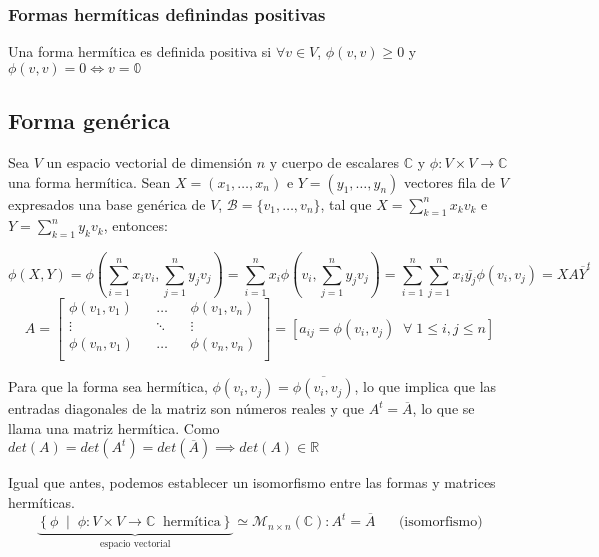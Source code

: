 \documentclass{preset}
\newcommand{\compconj}[1]{%
  \overline{#1}%
}
\begin{document}
\subsubsection{Formas hermíticas definindas positivas}
Una forma hermítica es definida positiva si $\forall v \in V$, $\phi(v,v)\geq 0$ y $\phi(v,v)=0 \iff v=\mathbb{0}$

\vspace{-15pt}
\subsection{Forma genérica}
Sea $V$ un espacio vectorial de dimensión $n$ y cuerpo de escalares $\mathbb{C}$ y $\phi: V \times V \rightarrow \mathbb{C}$ una forma hermítica. Sean $X=(x_1,\dots,x_n)$ e $Y=(y_1,\dots,y_n)$ vectores fila de $V$ expresados una base genérica de $V$, $\mathcal{B}=\{v_1,\dots,v_n\}$, tal que $X=\sum_{k=1}^{n}{x_k v_k}$ e $Y=\sum_{k=1}^{n}{y_k v_k}$, entonces:


\vspace{-10pt}
\[ \phi(X,Y)=\phi\left(\sum_{i=1}^{n}{x_i v_i},\sum_{j=1}^{n}{y_j v_j}\right)=\sum_{i=1}^{n}{x_i \phi\left( v_i, \sum_{j=1}^{n}{y_j v_j} \right)} = \sum_{i=1}^{n}{\sum_{j=1}^{n}{x_i \compconj{y_j} \phi\left( v_i, v_j \right)}}= X A \compconj{Y}^t\]
\vspace{-10pt}
\[ A=\left[\begin{matrix}
\phi(v_1,v_1) && \dots && \phi(v_1,v_n) \\
\vdots && \ddots && \vdots\\
\phi(v_n,v_1) && \dots && \phi(v_n,v_n) \\
\end{matrix}\right] = [a_{ij} = \phi(v_i,v_j) \;\; \forall \; 1 \leq i,j \leq n] \]

Para que la forma sea hermítica, $\phi(v_i,v_j) = \compconj{\phi(v_i,v_j)}$, lo que implica que las entradas diagonales de la matriz son números reales y que $A^t=\compconj{A}$, lo que se llama una matriz hermítica. Como $det(A)=det(A^t)=det(\compconj{A}) \implies det(A)\in \mathbb{R}$

\noindent Igual que antes, podemos establecer un isomorfismo entre las formas y matrices hermíticas.
\[ \underbrace{\left\{ \phi \;\; \vert \;\; \phi: V \times V \rightarrow \mathbb{C} \;\; \mbox{hermítica} \right\}}_{\mbox{espacio vectorial}}  \simeq \mathcal{M}_{n \times n} (\mathbb{C}) : A^t=\compconj{A} \;\;\;\;\;\; \mbox{(isomorfismo)}\]

\vspace{-15pt}
\end{document}
